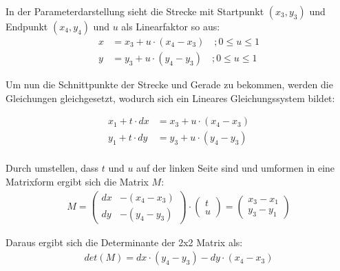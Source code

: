 \documentclass[a4paper,10pt,ngerman]{scrartcl}
\begin{document}
\begin{itemize}
  In der Parameterdarstellung sieht die Strecke mit Startpunkt $(x_{3}, y_{3})$ und Endpunkt $(x_{4}, y_{4})$ und $u$ als Linearfaktor so aus:
  \begin{align}
    x&=x_{3} + u \cdot (x_{4} - x_{3}) \quad; 0 \leq u \leq 1 \\
    y&=y_{3} + u \cdot (y_{4} - y_{3}) \quad; 0 \leq u \leq 1
  \end{align}

  Um nun die Schnittpunkte der Strecke und Gerade zu bekommen, werden die Gleichungen gleichgesetzt, wodurch sich ein Lineares Gleichungssystem bildet:

  \begin{align*}
    x_{1}+t\cdot dx&=x_{3}+u \cdot (x_{4} - x_{3}) \\
    y_{1}+t \cdot dy&=y_{3}+u\cdot (y_{4} - y_{3}) \\
  \end{align*}

  Durch umstellen, dass $t$ und $u$ auf der linken Seite sind und umformen in eine Matrixform ergibt sich die Matrix $M$:
  \begin{align}
    M = 
    \begin{pmatrix}
      dx & -(x_{4} - x_{3})\\
      dy & -(y_{4} - y_{3})
    \end{pmatrix}
    \cdot
    \begin{pmatrix}
      t \\
      u
    \end{pmatrix}
    =
    \begin{pmatrix}
      x_{3} - x_{1} \\
      y_{3} - y_{1}
    \end{pmatrix}
  \end{align}

  Daraus ergibt sich die Determinante der 2x2 Matrix als:
  \begin{align*}
    det(M) = dx \cdot (y_{4} - y_{3}) - dy \cdot (x_{4} - x_{3})
  \end{align*}


\end{itemize}
\end{document}
